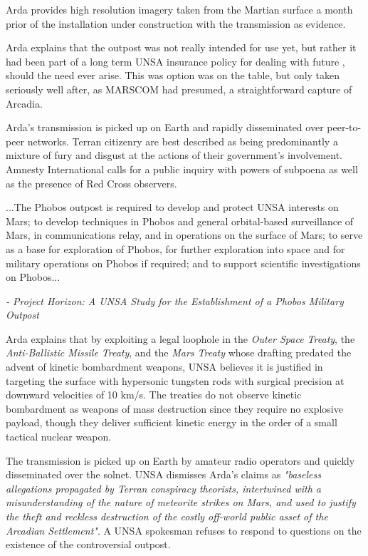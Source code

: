 Arda provides high resolution imagery taken from the Martian surface a month prior of the installation under construction with the transmission as evidence.

Arda explains that the outpost was not really intended for use yet, but rather it had been part of a long term UNSA insurance policy for dealing with future , should the need ever arise. This was option was on the table, but only taken seriously well after, as MARSCOM had presumed, a straightforward capture of Arcadia.

Arda's transmission is picked up on Earth and rapidly disseminated over peer-to-peer networks. Terran citizenry are best described as being predominantly a mixture of fury and disgust at the actions of their government's involvement. Amnesty International calls for a public inquiry with powers of subpoena as well as the presence of Red Cross observers.

\startTimelineGeneralDocument
...The Phobos outpost is required to develop and protect UNSA interests on Mars; to develop techniques in Phobos and general orbital-based surveillance of Mars, in communications relay, and in operations on the surface of Mars; to serve as a base for exploration of Phobos, for further exploration into space and for military operations on Phobos if required; and to support scientific investigations on Phobos...

\hskip 1.5cm {\it - Project Horizon: A UNSA Study for the Establishment of a Phobos Military Outpost}
\stopTimelineGeneralDocument

Arda explains that by exploiting a legal loophole in the {\it Outer Space Treaty}, the {\it Anti-Ballistic Missile Treaty}, and the {\it Mars Treaty} whose drafting predated the advent of kinetic bombardment weapons, UNSA believes it is justified in targeting the surface with hypersonic tungsten rods with surgical precision at downward velocities of 10 km/s. The treaties do not observe kinetic bombardment as weapons of mass destruction since they require no explosive payload, though they deliver sufficient kinetic energy in the order of a small tactical nuclear weapon.

The transmission is picked up on Earth by amateur radio operators and quickly disseminated over the solnet. UNSA dismisses Arda's claims as {\it "baseless allegations propagated by Terran conspiracy theorists, intertwined with a misunderstanding of the nature of meteorite strikes on Mars, and used to justify the theft and reckless destruction of the costly off-world public asset of the Arcadian Settlement"}. A UNSA spokesman refuses to respond to questions on the existence of the controversial outpost.
\StopTimelineDate

